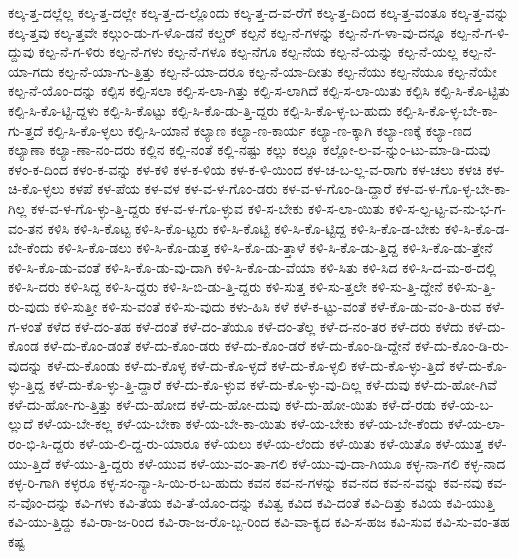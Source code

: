 {ಕಲ್ಕ-ತ್ತ-ದಲ್ಲೆಲ್ಲ
ಕಲ್ಕ-ತ್ತ-ದಲ್ಲೇ
ಕಲ್ಕ-ತ್ತ-ದ-ಲ್ಲೊಂದು
ಕಲ್ಕ-ತ್ತ-ದ-ವ-ರೆಗೆ
ಕಲ್ಕ-ತ್ತ-ದಿಂದ
ಕಲ್ಕ-ತ್ತ-ವಂತೂ
ಕಲ್ಕ-ತ್ತ-ವನ್ನು
ಕಲ್ಕ-ತ್ತವು
ಕಲ್ಕ-ತ್ತವೇ
ಕಲ್ಗುಂ-ಡು-ಗ-ಳೊ-ಡನೆ
ಕಲ್ಚರ್
ಕಲ್ಪನೆ
ಕಲ್ಪ-ನೆ-ಗಳನ್ನು
ಕಲ್ಪ-ನೆ-ಗ-ಳಾ-ವು-ದನ್ನೂ
ಕಲ್ಪ-ನೆ-ಗ-ಳಿ-ದ್ದುವು
ಕಲ್ಪ-ನೆ-ಗ-ಳಿರು
ಕಲ್ಪ-ನೆ-ಗಳು
ಕಲ್ಪ-ನೆ-ಗಳೂ
ಕಲ್ಪ-ನೆಗೂ
ಕಲ್ಪ-ನೆಯ
ಕಲ್ಪ-ನೆ-ಯನ್ನು
ಕಲ್ಪ-ನೆ-ಯಲ್ಲ
ಕಲ್ಪ-ನೆ-ಯಾ-ಗದು
ಕಲ್ಪ-ನೆ-ಯಾ-ಗು-ತ್ತಿತ್ತು
ಕಲ್ಪ-ನೆ-ಯಾ-ದರೂ
ಕಲ್ಪ-ನೆ-ಯಾ-ದೀತು
ಕಲ್ಪ-ನೆಯು
ಕಲ್ಪ-ನೆಯೂ
ಕಲ್ಪ-ನೆಯೇ
ಕಲ್ಪ-ನೆ-ಯೊಂ-ದನ್ನು
ಕಲ್ಪಿಸ
ಕಲ್ಪಿ-ಸಲಾ
ಕಲ್ಪಿ-ಸ-ಲಾ-ಗಿತ್ತು
ಕಲ್ಪಿ-ಸ-ಲಾಗಿದೆ
ಕಲ್ಪಿ-ಸ-ಲಾ-ಯಿತು
ಕಲ್ಪಿಸಿ
ಕಲ್ಪಿ-ಸಿ-ಕೊ-ಟ್ಟಿತು
ಕಲ್ಪಿ-ಸಿ-ಕೊ-ಟ್ಟಿ-ದ್ದಳು
ಕಲ್ಪಿ-ಸಿ-ಕೊಟ್ಟು
ಕಲ್ಪಿ-ಸಿ-ಕೊ-ಡು-ತ್ತಿ-ದ್ದರು
ಕಲ್ಪಿ-ಸಿ-ಕೊ-ಳ್ಳ-ಬ-ಹುದು
ಕಲ್ಪಿ-ಸಿ-ಕೊ-ಳ್ಳ-ಬೇ-ಕಾ-ಗು-ತ್ತದೆ
ಕಲ್ಪಿ-ಸಿ-ಕೊ-ಳ್ಳಲು
ಕಲ್ಪಿ-ಸಿ-ಯಾನೆ
ಕಲ್ಯಾಣ
ಕಲ್ಯಾ-ಣ-ಕಾರ್ಯ
ಕಲ್ಯಾ-ಣ-ಕ್ಕಾಗಿ
ಕಲ್ಯಾ-ಣಕ್ಕೆ
ಕಲ್ಯಾ-ಣದ
ಕಲ್ಯಾಣಾ
ಕಲ್ಯಾ-ಣಾ-ನಂ-ದರು
ಕಲ್ಲಿನ
ಕಲ್ಲಿ-ನಂತೆ
ಕಲ್ಲಿ-ನಷ್ಟು
ಕಲ್ಲು
ಕಲ್ಲೂ
ಕಲ್ಲೋ-ಲ-ವ-ನ್ನುಂ-ಟು-ಮಾ-ಡಿ-ದುವು
ಕಳಂ-ಕ-ದಿಂದ
ಕಳಂ-ಕ-ವನ್ನು
ಕಳ-ಕಳಿ
ಕಳ-ಕ-ಳಿಯ
ಕಳ-ಕ-ಳಿ-ಯಿಂದ
ಕಳ-ಚ-ಬ-ಲ್ಲ-ವ-ರಾಗು
ಕಳ-ಚಲು
ಕಳಚಿ
ಕಳ-ಚಿ-ಕೊ-ಳ್ಳಲು
ಕಳಪೆ
ಕಳ-ಪೆಯ
ಕಳ-ವಳ
ಕಳ-ವ-ಳ-ಗೊಂ-ಡರು
ಕಳ-ವ-ಳ-ಗೊಂ-ಡಿ-ದ್ದಾರೆ
ಕಳ-ವ-ಳ-ಗೊ-ಳ್ಳ-ಬೇ-ಕಾ-ಗಿಲ್ಲ
ಕಳ-ವ-ಳ-ಗೊ-ಳ್ಳು-ತ್ತಿ-ದ್ದರು
ಕಳ-ವ-ಳ-ಗೊ-ಳ್ಳುವ
ಕಳಿ-ಸ-ಬೇಕು
ಕಳಿ-ಸ-ಲಾ-ಯಿತು
ಕಳಿ-ಸ-ಲ್ಪ-ಟ್ಟ-ವ-ನು-ಭ-ಗ-ವಂ-ತನ
ಕಳಿಸಿ
ಕಳಿ-ಸಿ-ಕೊಟ್ಟ
ಕಳಿ-ಸಿ-ಕೊ-ಟ್ಟರು
ಕಳಿ-ಸಿ-ಕೊಟ್ಟಿ
ಕಳಿ-ಸಿ-ಕೊ-ಟ್ಟಿದ್ದ
ಕಳಿ-ಸಿ-ಕೊ-ಡ-ಬೇಕು
ಕಳಿ-ಸಿ-ಕೊ-ಡ-ಬೇ-ಕೆಂದು
ಕಳಿ-ಸಿ-ಕೊ-ಡಲು
ಕಳಿ-ಸಿ-ಕೊ-ಡುತ್ತ
ಕಳಿ-ಸಿ-ಕೊ-ಡು-ತ್ತಾಳೆ
ಕಳಿ-ಸಿ-ಕೊ-ಡು-ತ್ತಿದ್ದ
ಕಳಿ-ಸಿ-ಕೊ-ಡು-ತ್ತೇನೆ
ಕಳಿ-ಸಿ-ಕೊ-ಡು-ವಂತೆ
ಕಳಿ-ಸಿ-ಕೊ-ಡು-ವು-ದಾಗಿ
ಕಳಿ-ಸಿ-ಕೊ-ಡು-ವೆಯಾ
ಕಳಿ-ಸಿತು
ಕಳಿ-ಸಿದ
ಕಳಿ-ಸಿ-ದ-ಮ-ಠ-ದಲ್ಲಿ
ಕಳಿ-ಸಿ-ದರು
ಕಳಿ-ಸಿದ್ದ
ಕಳಿ-ಸಿ-ದ್ದರು
ಕಳಿ-ಸಿ-ಬಿ-ಡು-ತ್ತಿ-ದ್ದರು
ಕಳಿ-ಸುತ್ತ
ಕಳಿ-ಸು-ತ್ತಲೇ
ಕಳಿ-ಸು-ತ್ತಿ-ದ್ದೇನೆ
ಕಳಿ-ಸು-ತ್ತಿ-ರು-ವುದು
ಕಳಿ-ಸುತ್ತೀ
ಕಳಿ-ಸು-ವಂತೆ
ಕಳಿ-ಸು-ವುದು
ಕಳು-ಹಿಸಿ
ಕಳೆ
ಕಳೆ-ಕ-ಟ್ಟು-ವಂತೆ
ಕಳೆ-ಕೊ-ಡು-ವಂ-ತಿ-ರುವ
ಕಳೆ-ಗ-ಳಂತೆ
ಕಳೆದ
ಕಳೆ-ದಂ-ತಹ
ಕಳೆ-ದಂತೆ
ಕಳೆ-ದಂ-ತೆಯೂ
ಕಳೆ-ದಂ-ತೆಲ್ಲ
ಕಳೆ-ದ-ನಂ-ತರ
ಕಳೆ-ದರು
ಕಳೆದು
ಕಳೆ-ದು-ಕೊಂಡ
ಕಳೆ-ದು-ಕೊಂ-ಡಂತೆ
ಕಳೆ-ದು-ಕೊಂ-ಡರು
ಕಳೆ-ದು-ಕೊಂ-ಡರೆ
ಕಳೆ-ದು-ಕೊಂ-ಡಿ-ದ್ದೇನೆ
ಕಳೆ-ದು-ಕೊಂ-ಡಿ-ರು-ವುದನ್ನು
ಕಳೆ-ದು-ಕೊಂಡು
ಕಳೆ-ದು-ಕೊಳ್ಳ
ಕಳೆ-ದು-ಕೊ-ಳ್ಳದೆ
ಕಳೆ-ದು-ಕೊ-ಳ್ಳಲಿ
ಕಳೆ-ದು-ಕೊ-ಳ್ಳು-ತ್ತಿದೆ
ಕಳೆ-ದು-ಕೊ-ಳ್ಳು-ತ್ತಿದ್ದ
ಕಳೆ-ದು-ಕೊ-ಳ್ಳು-ತ್ತಿ-ದ್ದಾರೆ
ಕಳೆ-ದು-ಕೊ-ಳ್ಳುವ
ಕಳೆ-ದು-ಕೊ-ಳ್ಳು-ವು-ದಿಲ್ಲ
ಕಳೆ-ದುವು
ಕಳೆ-ದು-ಹೋ-ಗಿವೆ
ಕಳೆ-ದು-ಹೋ-ಗು-ತ್ತಿತ್ತು
ಕಳೆ-ದು-ಹೋದ
ಕಳೆ-ದು-ಹೋ-ದುವು
ಕಳೆ-ದು-ಹೋ-ಯಿತು
ಕಳೆ-ದೆ-ರಡು
ಕಳೆ-ಯ-ಬ-ಲ್ಲುದೆ
ಕಳೆ-ಯ-ಬೇ-ಕಲ್ಲ
ಕಳೆ-ಯ-ಬೇಕಾ
ಕಳೆ-ಯ-ಬೇ-ಕಾ-ಯಿತು
ಕಳೆ-ಯ-ಬೇಕು
ಕಳೆ-ಯ-ಬೇ-ಕೆಂದು
ಕಳೆ-ಯ-ಲಾ-ರಂ-ಭಿ-ಸಿ-ದ್ದರು
ಕಳೆ-ಯ-ಲಿ-ದ್ದ-ರು-ಯಾರೂ
ಕಳೆ-ಯಲು
ಕಳೆ-ಯ-ಲೆಂದು
ಕಳೆ-ಯಿತು
ಕಳೆ-ಯಿತೊ
ಕಳೆ-ಯುತ್ತ
ಕಳೆ-ಯು-ತ್ತಿದೆ
ಕಳೆ-ಯು-ತ್ತಿ-ದ್ದರು
ಕಳೆ-ಯುವ
ಕಳೆ-ಯು-ವಂ-ತಾ-ಗಲಿ
ಕಳೆ-ಯು-ವು-ದಾ-ಗಿಯೂ
ಕಳ್ಳ-ನಾ-ಗಲಿ
ಕಳ್ಳ-ನಾದ
ಕಳ್ಳ-ರಿ-ಗಾಗಿ
ಕಳ್ಳರೂ
ಕಳ್ಳ-ಸಂ-ನ್ಯಾ-ಸಿ-ಯಿ-ರ-ಬ-ಹುದು
ಕವನ
ಕವ-ನ-ಗಳನ್ನು
ಕವ-ನದ
ಕವ-ನ-ವನ್ನು
ಕವ-ನವು
ಕವ-ನ-ವೊಂ-ದನ್ನು
ಕವಿ-ಗಳು
ಕವಿ-ತೆಯ
ಕವಿ-ತೆ-ಯೊಂ-ದನ್ನು
ಕವಿತ್ವ
ಕವಿದ
ಕವಿ-ದಂತೆ
ಕವಿ-ದಿತ್ತು
ಕವಿಯ
ಕವಿ-ಯುತ್ತಿ
ಕವಿ-ಯು-ತ್ತಿದ್ದು
ಕವಿ-ರಾ-ಜ-ರಿಂದ
ಕವಿ-ರಾ-ಜ-ರೊ-ಬ್ಬ-ರಿಂದ
ಕವಿ-ವಾ-ಕ್ಯದ
ಕವಿ-ಸ-ಹಜ
ಕವಿ-ಸುವ
ಕವಿ-ಸು-ವಂ-ತಹ
ಕಷ್ಟ
}
